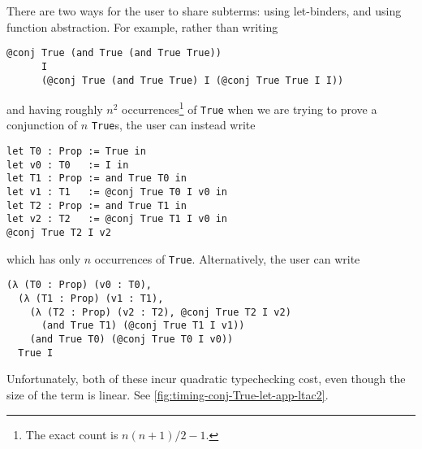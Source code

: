 There are two ways for the user to share subterms: using let-binders, and using function abstraction.
For example, rather than writing
\begin{verbatim}
@conj True (and True (and True True))
      I
      (@conj True (and True True) I (@conj True True I I))
\end{verbatim}
and having roughly $n^2$ occurrences\footnote{The exact count is $n(n+1)/2 - 1$.} of \texttt{True} when we are trying to prove a conjunction of $n$ \texttt{True}s, the user can instead write
\begin{verbatim}
let T0 : Prop := True in
let v0 : T0   := I in
let T1 : Prop := and True T0 in
let v1 : T1   := @conj True T0 I v0 in
let T2 : Prop := and True T1 in
let v2 : T2   := @conj True T1 I v0 in
@conj True T2 I v2
\end{verbatim}
which has only $n$ occurrences of \texttt{True}.
Alternatively, the user can write
\begin{verbatim}
(λ (T0 : Prop) (v0 : T0),
  (λ (T1 : Prop) (v1 : T1),
    (λ (T2 : Prop) (v2 : T2), @conj True T2 I v2)
      (and True T1) (@conj True T1 I v1))
    (and True T0) (@conj True T0 I v0))
  True I
\end{verbatim}

Unfortunately, both of these incur quadratic typechecking cost, even though the size of the term is linear.
See \autoref{fig:timing-conj-True-let-app-ltac2}.

